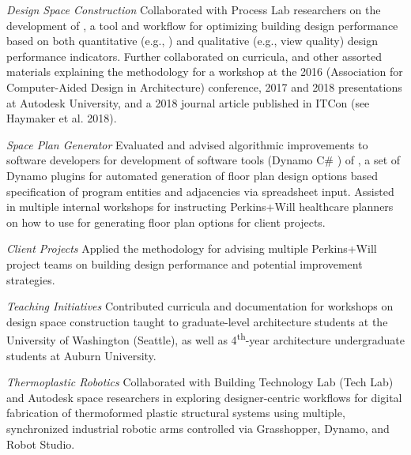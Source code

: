 \documentclass[letterpaper, oneside, 10pt]{article}
\begin{document}

\textit{Design Space Construction } \DotSep{0.25em}
Collaborated with Process Lab researchers on the development of , a
tool and workflow for optimizing building design performance based on both
quantitative (e.g., ) and qualitative (e.g., view quality) design
performance indicators. Further collaborated on curricula, and other
assorted materials explaining the  methodology for a workshop at
the 2016  (Association for Computer-Aided Design in Architecture)
conference, 2017 and 2018 presentations at Autodesk University, and a 2018
journal article published in ITCon (see Haymaker et al. 2018).

\hfill
\vspace{3pt}

\textit{Space Plan Generator } \DotSep{0.25em}
Evaluated and advised algorithmic improvements to software developers for
development of software tools (Dynamo C\# ) of
, a set of Dynamo plugins for automated generation of
floor plan design options based specification of program entities and
adjacencies via spreadsheet input. Assisted in multiple internal workshops
for instructing Perkins+Will healthcare planners on how to use
 for generating floor plan options for client projects.

\textit{Client Projects} \DotSep{0.25em}
Applied the  methodology for advising multiple
Perkins+Will project teams on building design performance and
potential improvement strategies.

\textit{Teaching Initiatives} \DotSep{0.25em}
Contributed curricula and documentation for workshops on design space
construction taught to graduate-level architecture students at the
University of Washington (Seattle), as well as 4\textsuperscript{th}-year
architecture undergraduate students at Auburn University.


\hfill
\vspace{-14.5pt}


\textit{Thermoplastic Robotics} \DotSep{0.25em}
Collaborated with Building Technology Lab (Tech Lab) and Autodesk
 space researchers in exploring designer-centric
workflows for digital fabrication of thermoformed plastic structural
systems using multiple, synchronized industrial robotic arms controlled
via Grasshopper, Dynamo, and  Robot Studio.


\end{document}
